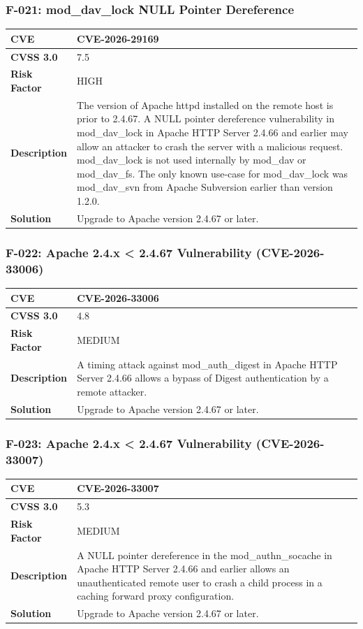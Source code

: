 \subsubsection{F-021: mod\_dav\_lock NULL Pointer Dereference}
\begin{tabular}{|p{2.8cm}|p{12.2cm}|}
\hline
\textbf{CVE} & CVE-2026-29169 \\ \hline
\textbf{CVSS 3.0} & 7.5 \\ \hline
\textbf{Risk Factor} & HIGH \\ \hline
\textbf{Description} & The version of Apache httpd installed on the remote host is prior to 2.4.67. A NULL pointer dereference vulnerability in mod\_dav\_lock in Apache HTTP Server 2.4.66 and earlier may allow an attacker to crash the server with a malicious request. mod\_dav\_lock is not used internally by mod\_dav or mod\_dav\_fs. The only known use-case for mod\_dav\_lock was mod\_dav\_svn from Apache Subversion earlier than version 1.2.0. \\ \hline
\textbf{Solution} & Upgrade to Apache version 2.4.67 or later. \\ \hline
\end{tabular}

\subsubsection{F-022: Apache 2.4.x < 2.4.67 Vulnerability (CVE-2026-33006)}
\begin{tabular}{|p{2.8cm}|p{12.2cm}|}
\hline
\textbf{CVE} & CVE-2026-33006 \\ \hline
\textbf{CVSS 3.0} & 4.8 \\ \hline
\textbf{Risk Factor} & MEDIUM \\ \hline
\textbf{Description} & A timing attack against mod\_auth\_digest in Apache HTTP Server 2.4.66 allows a bypass of Digest authentication by a remote attacker. \\ \hline
\textbf{Solution} & Upgrade to Apache version 2.4.67 or later. \\ \hline
\end{tabular}

\subsubsection{F-023: Apache 2.4.x < 2.4.67 Vulnerability (CVE-2026-33007)}
\begin{tabular}{|p{2.8cm}|p{12.2cm}|}
\hline
\textbf{CVE} & CVE-2026-33007 \\ \hline
\textbf{CVSS 3.0} & 5.3 \\ \hline
\textbf{Risk Factor} & MEDIUM \\ \hline
\textbf{Description} & A NULL pointer dereference in the mod\_authn\_socache in Apache HTTP Server 2.4.66 and earlier allows an unauthenticated remote user to crash a child process in a caching forward proxy configuration. \\ \hline
\textbf{Solution} & Upgrade to Apache version 2.4.67 or later. \\ \hline
\end{tabular}


